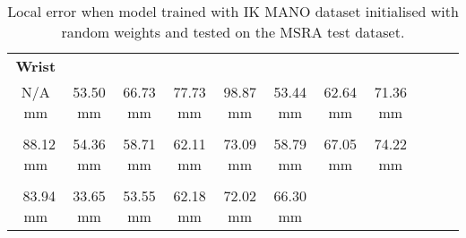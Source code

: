     \begin{table}[!ht]
    \begin{tabular}{|c|c|c|c|c|c|c|c|c|c|c|}
    \hline
    {\bfseries Wrist} & \cellcolor[HTML]{ffbf00}{\bfseries IMCP} & \cellcolor[HTML]{ff8000}{\bfseries IPIP} & \cellcolor[HTML]{ff7500}{\bfseries IDIP} & \cellcolor[HTML]{ff0000}{\bfseries ITIP} & \cellcolor[HTML]{ffbf00}{\bfseries MMCP} & \cellcolor[HTML]{ff8000}{\bfseries MPIP} & \cellcolor[HTML]{ff7500}{\bfseries MDIP}  \\
    N/A mm & \cellcolor[HTML]{ffbf00}$\,\,\,$53.50 mm & \cellcolor[HTML]{ff8000}$\,\,\,$66.73 mm & \cellcolor[HTML]{ff7500}$\,\,\,$77.73 mm & \cellcolor[HTML]{ff0000}$\,\,\,$98.87 mm & \cellcolor[HTML]{ffbf00}$\,\,\,$53.44 mm & \cellcolor[HTML]{ff8000}$\,\,\,$62.64 mm & \cellcolor[HTML]{ff7500}$\,\,\,$71.36 mm\\
    \hline
    \cellcolor[HTML]{ff2500}{\bfseries MTIP} & \cellcolor[HTML]{ffbf00}{\bfseries RMCP} & \cellcolor[HTML]{ffbf00}{\bfseries RPIP} & \cellcolor[HTML]{ff8000}{\bfseries RDIP} & \cellcolor[HTML]{ff7500}{\bfseries RTIP} & \cellcolor[HTML]{ffbf00}{\bfseries PMCP} & \cellcolor[HTML]{ff8000}{\bfseries PPIP} & \cellcolor[HTML]{ff7500}{\bfseries PDIP}  \\
    \cellcolor[HTML]{ff2500}$\,\,\,$88.12 mm & \cellcolor[HTML]{ffbf00}$\,\,\,$54.36 mm & \cellcolor[HTML]{ffbf00}$\,\,\,$58.71 mm & \cellcolor[HTML]{ff8000}$\,\,\,$62.11 mm & \cellcolor[HTML]{ff7500}$\,\,\,$73.09 mm & \cellcolor[HTML]{ffbf00}$\,\,\,$58.79 mm & \cellcolor[HTML]{ff8000}$\,\,\,$67.05 mm & \cellcolor[HTML]{ff7500}$\,\,\,$74.22 mm\\
    \hline
    \cellcolor[HTML]{ff2500}{\bfseries PTIP} & \cellcolor[HTML]{bfff00}{\bfseries TMCP} & \cellcolor[HTML]{ffbf00}{\bfseries TPIP} & \cellcolor[HTML]{ff8000}{\bfseries PDIP} & \cellcolor[HTML]{ff7500}{\bfseries TTIP} & \cellcolor[HTML]{ff8000}{\bfseries Average}  \\
    \cellcolor[HTML]{ff2500}$\,\,\,$83.94 mm & \cellcolor[HTML]{bfff00}$\,\,\,$33.65 mm & \cellcolor[HTML]{ffbf00}$\,\,\,$53.55 mm & \cellcolor[HTML]{ff8000}$\,\,\,$62.18 mm & \cellcolor[HTML]{ff7500}$\,\,\,$72.02 mm & \cellcolor[HTML]{ff8000}$\,\,\,$66.30 mm \\
    \cline{1-6}
    \end{tabular}
    \caption{Local error when model trained with IK MANO dataset initialised with random weights and tested on the MSRA test dataset.}
    \label{}
    \end{table}